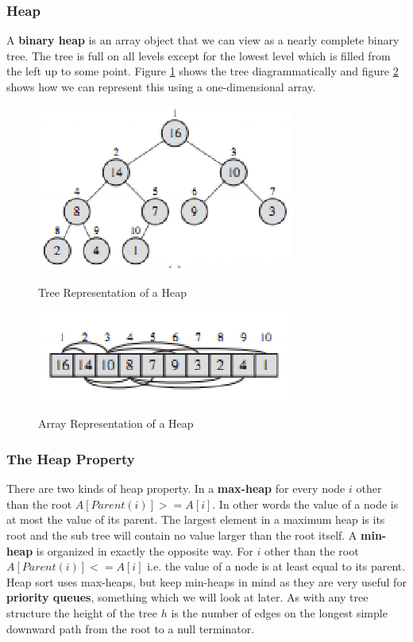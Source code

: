 \documentclass[10pt,a4paper]{article}
\begin{document}
\subsubsection{Heap}
A {\bf binary heap} is an array object that we can view as a nearly complete binary tree. The tree is full on all levels except for the lowest level which is filled from the left up to some point. Figure \ref{heap} shows the tree diagrammatically and figure \ref{heaparray} shows how we can represent this using a one-dimensional array. 
\begin{figure}
\caption{Tree Representation of a Heap \cite{INTROALG}}
\begin{center}
\includegraphics[scale=0.43]{../images/heap.png}
\label{heap}
\end{center}
\end{figure}
\begin{figure}
\caption{Array Representation of a Heap \cite{INTROALG}}
\begin{center}
\includegraphics[scale=0.43]{../images/heaparray.png}
\label{heaparray}
\end{center}
\end{figure}
\subsubsection{The Heap Property}
There are two kinds of heap property. In a {\bf max-heap} for every node $i$ other than the root $A[Parent(i)]>= A[i]$. In other words the value of a node is at most the value of its parent. The largest element in a maximum heap is its root and the sub tree will contain no value larger than the root itself. A {\bf min-heap} is organized in exactly the opposite way. For $i$ other than the root $A[Parent(i)]<= A[i]$ i.e. the value of a node is at least equal to its parent. Heap sort uses max-heaps, but keep min-heaps in mind as they are very useful for {\bf priority queues}, something which we will look at later. As with any tree structure the height of the tree $h$ is the number of edges on the longest simple downward path from the root to a null terminator. 
\end{document}
